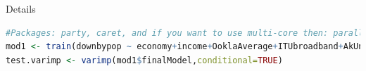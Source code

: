 \documentclass{beamer}
\begin{document}
\begin{frame}[fragile]{Details}
\begin{scriptsize}
		\begin{lstlisting}[caption={Regression Analysis with Random Forests},label={lst:cForest},language={R},showspaces=false,breaklines=true]
#Packages: party, caret, and if you want to use multi-core then: parallel, doMC 
mod1 <- train(downbypop ~ economy+income+OoklaAverage+ITUbroadband+AkUniqueIP+AkAverage+AkPeak+AkHighBroadband+AkBroadband+AkNarrowband+DemIndex, data = downdata,method = "cforest",trControl = trainControl(method = "oob",allowParallel = TRUE, number = 10, repeats = 10),controls = cforest_unbiased(ntree = 10000))
test.varimp <- varimp(mod1$finalModel,conditional=TRUE)		
		\end{lstlisting}
		\end{scriptsize}
\end{frame}
\end{document}
